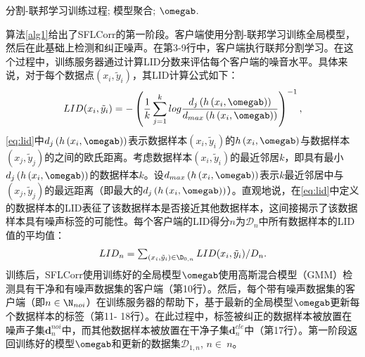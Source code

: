 \begin{algorithm}[H]
\caption{SFLCorr 第三阶段}\label{alg3}
\begin{algorithmic}[1]
\STATE 分割-联邦学习训练过程; 
\ENDFOR
\STATE 模型聚合;
\ENDFOR
\RETURN $\omegab$.
\end{algorithmic}
\end{algorithm}

算法\ref{alg1}给出了SFLCorr的第一阶段。客户端使用分割-联邦学习训练全局模型，然后在此基础上检测和纠正噪声。在第3-9行中，客户端执行联邦分割学习。在这个过程中，训练服务器通过计算LID分数来评估每个客户端的噪音水平。具体来说，对于每个数据点$(x_i,\tilde{y}_i)$，其LID计算公式如下\cite{xu2022fedcorr}：
\begin{align}\label{eq:lid}
LID(x_i,\tilde{y}_i)=-\left(\frac{1}{k}\sum_{j=1}^klog\frac{d_j\left(h\left(x_i,\omegab\right)\right)}{d_{max}\left(h\left(x_i,\omegab\right)\right)}\right)^{-1},
\end{align}
\eqref{eq:lid}中$d_j\left(h\left(x_i,\omegab\right)\right)$表示数据样本$(x_i,\tilde{y}_i)$的$h\left(x_i,\omegab\right)$与数据样本$(x_j,\tilde{y}_j)$的之间的欧氏距离。考虑数据样本$(x_i,\tilde{y}_i)$的最近邻居$k$，即具有最小$d_j\left(h\left(x_i,\omegab\right)\right)$的数据样本$k$。设$d_{max}\left(h\left(x_i,\omegab\right)\right)$表示$k$最近邻居中与$(x_j,\tilde{y}_j)$的最远距离（即最大的$d_j\left(h\left(x_i,\omegab\right)\right)$）。直观地说，在\eqref{eq:lid}中定义的数据样本的LID表征了该数据样本是否接近其他数据样本，这间接揭示了该数据样本具有噪声标签的可能性。每个客户端的LID得分$n$为$\mathcal{D}_n$中所有数据样本的LID值的平均值：\begin{equation}\label{definition of lid}
\textstyle LID_n = \sum_{(x_i,\tilde{y}_i)\in\D_{0,n}} LID(x_i,\tilde{y}_i)/D_n.
\end{equation}
训练后，SFLCorr使用训练好的全局模型$\omegab$使用高斯混合模型（GMM）检测具有干净和有噪声数据集的客户端（第10行）。然后，每个带有噪声数据集的客户端（即$n\in\N_{noi}$）在训练服务器的帮助下，基于最新的全局模型$\omegab$更新每个数据样本的标签（第11- 18行）。在此过程中，标签被纠正的数据样本被放置在噪声子集$\boldsymbol{d}_n^{noi}$中，而其他数据样本被放置在干净子集$\boldsymbol{d}_n^{cle}$中（第17行）。第一阶段返回训练好的模型$\omegab$和更新的数据集$\mathcal{D}_{1,n}$, $n\in\ n $。
